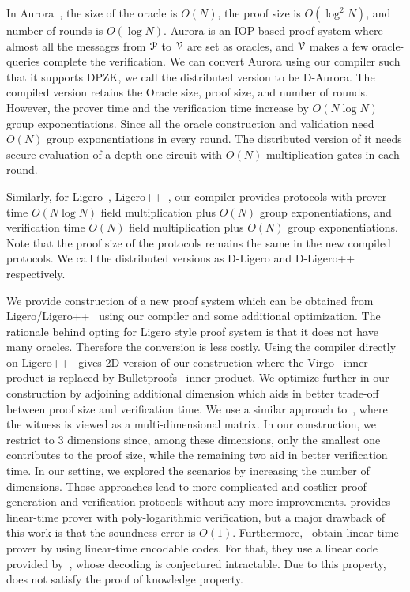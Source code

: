 In Aurora~\cite{aurora}, the size of the oracle is $O(N)$, the proof size is $O(\log^2 N)$, and number of rounds is $O(\log N)$. Aurora is an IOP-based proof system where almost all the messages from $\mathcal{P}$ to $\mathcal{V}$ are set as oracles, and $\mathcal{V}$ makes a few oracle-queries complete the verification.
We can convert Aurora using our compiler such that it supports DPZK, we call the distributed version to be D-Aurora. The compiled version retains the Oracle size, proof size, and number of rounds. However, the prover time and the verification time increase by $O(N\log N)$ group exponentiations. Since all the oracle construction and validation need $O(N)$ group exponentiations in every round. The distributed version of it needs secure evaluation of a depth one circuit with $O(N)$ multiplication gates in each round.

Similarly, for Ligero~\cite{ligero}, Ligero++~\cite{ligero++}, our compiler provides protocols with  prover time $O(N\log N)$ field multiplication plus $O(N)$ group exponentiations, and verification time $O(N)$ field multiplication plus $O(N)$ group exponentiations. Note that the proof size of the protocols remains the same in the new compiled protocols. We call the distributed versions as D-Ligero and D-Ligero++ respectively.

We provide construction of a new proof system which can be obtained from Ligero/Ligero++~\cite{ligero,ligero++} using our compiler and some additional optimization. The rationale behind opting for Ligero style proof system is that it does not have many oracles. Therefore the conversion is less costly.
Using the compiler directly on Ligero++~\cite{ligero++} gives 2D version of our construction where the Virgo~\cite{Virgo} inner product is replaced by Bulletproofs~\cite{bulletproofs} inner product. We optimize further in our construction by adjoining additional dimension which aids in better trade-off between proof size and verification time. 
We use a similar approach to~\cite{bootle2020linear, bootle2020zero}, where the witness is viewed as a multi-dimensional matrix. In our construction, we restrict to 3 dimensions since, among these dimensions, only the smallest one contributes to the proof size, while the remaining two aid in better verification time. In our setting, we explored the scenarios by increasing the number of dimensions. Those approaches lead to more complicated and costlier proof-generation and verification protocols without any more improvements. \cite{bootle2020zero} provides linear-time prover with poly-logarithmic verification, but a major drawback of this work is that the soundness error is $O(1)$. Furthermore,~\cite{bootle2020linear} obtain linear-time prover by using linear-time encodable codes. For that, they use a linear code provided by~\cite{druk2014linear}, whose decoding is conjectured intractable. Due to this property, ~\cite{bootle2020linear} does not satisfy the proof of knowledge property.

